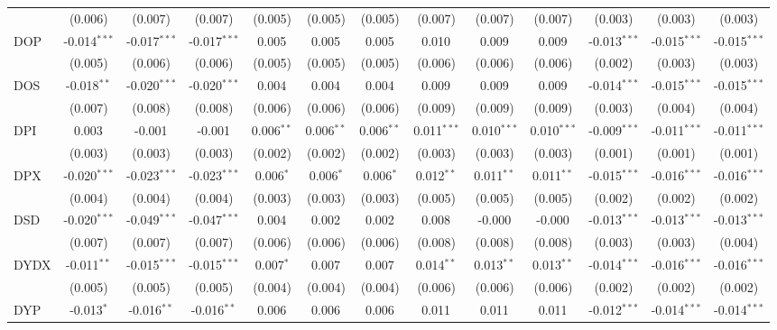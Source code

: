 \begin{table}[!htbp]
\begin{tabular}{@{\extracolsep{5pt}}lcccccccccccc}
  & (0.006) & (0.007) & (0.007) & (0.005) & (0.005) & (0.005) & (0.007) & (0.007) & (0.007) & (0.003) & (0.003) & (0.003) \\
 DOP & -0.014$^{***}$ & -0.017$^{***}$ & -0.017$^{***}$ & 0.005$^{}$ & 0.005$^{}$ & 0.005$^{}$ & 0.010$^{}$ & 0.009$^{}$ & 0.009$^{}$ & -0.013$^{***}$ & -0.015$^{***}$ & -0.015$^{***}$ \\
  & (0.005) & (0.006) & (0.006) & (0.005) & (0.005) & (0.005) & (0.006) & (0.006) & (0.006) & (0.002) & (0.003) & (0.003) \\
 DOS & -0.018$^{**}$ & -0.020$^{***}$ & -0.020$^{***}$ & 0.004$^{}$ & 0.004$^{}$ & 0.004$^{}$ & 0.009$^{}$ & 0.009$^{}$ & 0.009$^{}$ & -0.014$^{***}$ & -0.015$^{***}$ & -0.015$^{***}$ \\
  & (0.007) & (0.008) & (0.008) & (0.006) & (0.006) & (0.006) & (0.009) & (0.009) & (0.009) & (0.003) & (0.004) & (0.004) \\
 DPI & 0.003$^{}$ & -0.001$^{}$ & -0.001$^{}$ & 0.006$^{**}$ & 0.006$^{**}$ & 0.006$^{**}$ & 0.011$^{***}$ & 0.010$^{***}$ & 0.010$^{***}$ & -0.009$^{***}$ & -0.011$^{***}$ & -0.011$^{***}$ \\
  & (0.003) & (0.003) & (0.003) & (0.002) & (0.002) & (0.002) & (0.003) & (0.003) & (0.003) & (0.001) & (0.001) & (0.001) \\
 DPX & -0.020$^{***}$ & -0.023$^{***}$ & -0.023$^{***}$ & 0.006$^{*}$ & 0.006$^{*}$ & 0.006$^{*}$ & 0.012$^{**}$ & 0.011$^{**}$ & 0.011$^{**}$ & -0.015$^{***}$ & -0.016$^{***}$ & -0.016$^{***}$ \\
  & (0.004) & (0.004) & (0.004) & (0.003) & (0.003) & (0.003) & (0.005) & (0.005) & (0.005) & (0.002) & (0.002) & (0.002) \\
 DSD & -0.020$^{***}$ & -0.049$^{***}$ & -0.047$^{***}$ & 0.004$^{}$ & 0.002$^{}$ & 0.002$^{}$ & 0.008$^{}$ & -0.000$^{}$ & -0.000$^{}$ & -0.013$^{***}$ & -0.013$^{***}$ & -0.013$^{***}$ \\
  & (0.007) & (0.007) & (0.007) & (0.006) & (0.006) & (0.006) & (0.008) & (0.008) & (0.008) & (0.003) & (0.003) & (0.004) \\
 DYDX & -0.011$^{**}$ & -0.015$^{***}$ & -0.015$^{***}$ & 0.007$^{*}$ & 0.007$^{}$ & 0.007$^{}$ & 0.014$^{**}$ & 0.013$^{**}$ & 0.013$^{**}$ & -0.014$^{***}$ & -0.016$^{***}$ & -0.016$^{***}$ \\
  & (0.005) & (0.005) & (0.005) & (0.004) & (0.004) & (0.004) & (0.006) & (0.006) & (0.006) & (0.002) & (0.002) & (0.002) \\
 DYP & -0.013$^{*}$ & -0.016$^{**}$ & -0.016$^{**}$ & 0.006$^{}$ & 0.006$^{}$ & 0.006$^{}$ & 0.011$^{}$ & 0.011$^{}$ & 0.011$^{}$ & -0.012$^{***}$ & -0.014$^{***}$ & -0.014$^{***}$ \\

\end{tabular}
\end{table}
